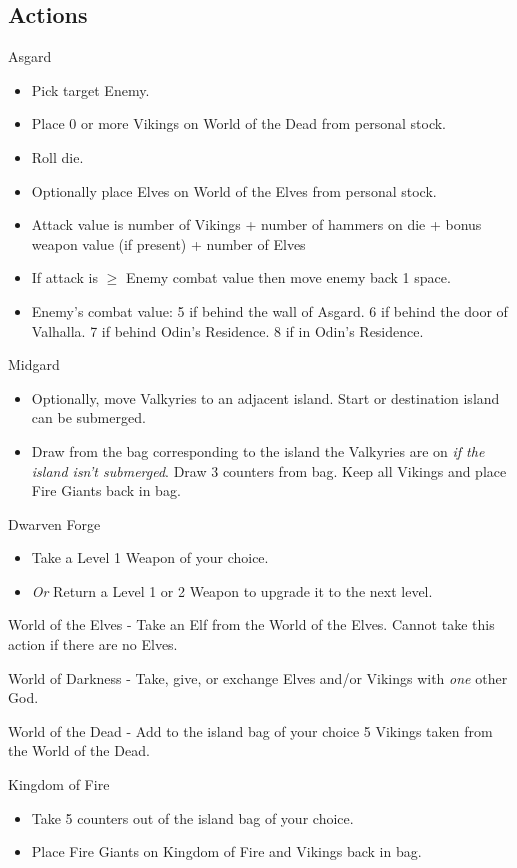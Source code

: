 \documentclass[12pt]{article}
\newenvironment{itemizeCustom}
{\begin{itemize}
  \setlength{\itemsep}{1pt}
  \setlength{\parskip}{0pt}
  \setlength{\parsep}{0pt}}
{\end{itemize}}
\begin{document}
\begin{multicols*}{2}
\section*{Actions}
Asgard
\begin{itemizeCustom}
	\item Pick target Enemy.
	\item Place 0 or more Vikings on World of the Dead from personal stock.
	\item Roll die.
	\item Optionally place Elves on World of the Elves from personal stock.
	\item Attack value is number of Vikings + number of hammers on die + bonus weapon value (if present) + number of Elves
	\item If attack is $\ge$ Enemy combat value then move enemy back 1 space.
	\item Enemy's combat value: 5 if behind the wall of Asgard. 6 if behind the door of Valhalla. 7 if behind Odin's Residence. 8 if in Odin's Residence.
\end{itemizeCustom}

\noindent
Midgard
\begin{itemizeCustom}
	\item Optionally, move Valkyries to an adjacent island. Start or destination island can be submerged.
	\item Draw from the bag corresponding to the island the Valkyries are on \emph{if the island isn't submerged}. Draw 3 counters from bag. Keep all Vikings and place Fire Giants back in bag.
\end{itemizeCustom}

\noindent
Dwarven Forge
\begin{itemizeCustom}
	\item Take a Level 1 Weapon of your choice.
	\item \emph{Or} Return a Level 1 or 2 Weapon to upgrade it to the next level.
\end{itemizeCustom}

\noindent
World of the Elves - Take an Elf from the World of the Elves. Cannot take this action if there are no Elves.

\noindent
World of Darkness - Take, give, or exchange Elves and/or Vikings with \emph{one} other God.

\noindent
World of the Dead - Add to the island bag of your choice 5 Vikings taken from the World of the Dead.

\noindent
Kingdom of Fire 
\begin{itemizeCustom}
	\item Take 5 counters out of the island bag of your choice. 
	\item Place Fire Giants on Kingdom of Fire and Vikings back in bag.
\end{itemizeCustom}


\end{multicols*}
\end{document}
